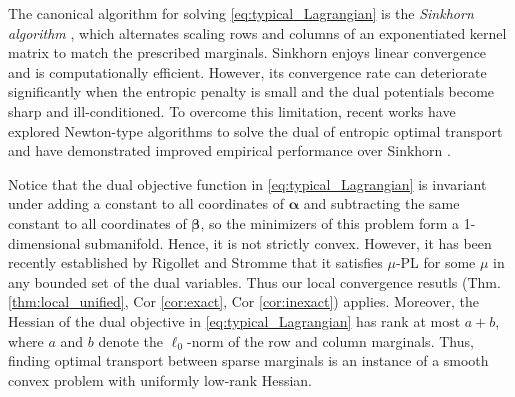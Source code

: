 \documentclass[11pt]{amsart}
\theoremstyle{plain}
\theoremstyle{definition}
\theoremstyle{remark}
\def\bZ{\mathbf{Z}}
\def\W{\mathbf{W}}
\def\balpha{\boldsymbol{\alpha}}
\def\bbeta{\boldsymbol{\beta}}
\def\r{\mathbf{r}}
\def\c{\mathbf{c}}
\begin{document}
The canonical algorithm for solving \eqref{eq:typical_Lagrangian} is the \textit{Sinkhorn algorithm} \cite{cuturi2013sinkhorn}, which alternates scaling rows and columns of an exponentiated kernel matrix to match the prescribed marginals. Sinkhorn enjoys linear convergence \cite{carlier2022linear} and is computationally efficient. However, its convergence rate can deteriorate significantly when the entropic penalty is small and the dual potentials become sharp and ill-conditioned. To overcome this limitation, recent works have explored Newton-type algorithms to solve the dual of entropic optimal transport and have demonstrated improved empirical performance over Sinkhorn \cite{brauer2017sinkhorn, tang2024safe}. 

Notice that the dual objective function in \eqref{eq:typical_Lagrangian} is invariant under adding a constant to all coordinates of $\balpha$ and subtracting the same constant to all coordinates of $\bbeta$, so the minimizers of this problem form a 1-dimensional submanifold. Hence, it is not strictly convex. However, it has been recently established by Rigollet and Stromme  \cite[Prop. 12]{rigollet2025sample} that it satisfies $\mu$-PL for some $\mu$ in any bounded set of the dual variables. %
Thus our local convergence resutls (Thm. \ref{thm:local_unified}, Cor \ref{cor:exact}, Cor \ref{cor:inexact}) applies. Moreover, the Hessian of the dual objective in \eqref{eq:typical_Lagrangian} has rank at most $a+b$, where $a$ and $b$ denote the $\ell_{0}$-norm of the row and column marginals. Thus, finding optimal transport between sparse marginals is an instance of a smooth convex problem with uniformly low-rank Hessian. 

\end{document}
